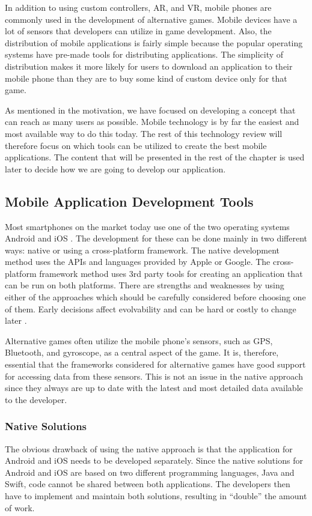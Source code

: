 \documentclass[../Main.tex]{subfiles}
\begin{document}
In addition to using custom controllers, AR, and VR, mobile phones are commonly used in the development of alternative games. Mobile devices have a lot of sensors that developers can utilize in game development. Also, the distribution of mobile applications is fairly simple because the popular operating systems have pre-made tools for distributing applications. The simplicity of distribution makes it more likely for users to download an application to their mobile phone than they are to buy some kind of custom device only for that game.

As mentioned in the motivation, we have focused on developing a concept that can reach as many users as possible. Mobile technology is by far the easiest and most available way to do this today. The rest of this technology review will therefore focus on which tools can be utilized to create the best mobile applications. The content that will be presented in the rest of the chapter is used later to decide how we are going to develop our application.


\subsection{Mobile Application Development Tools}
Most smartphones on the market today use one of the two operating systems Android and iOS \citep{statcounter_mobile_2020}. The development for these can be done mainly in two different ways: native or using a cross-platform framework. The native development method uses the APIs and languages provided by Apple or Google. The cross-platform framework method uses 3rd party tools for creating an application that can be run on both platforms. There are strengths and weaknesses by using either of the approaches which should be carefully considered before choosing one of them. Early decisions affect evolvability and can be hard or costly to change later \citep{ford_building_2017}. 

Alternative games often utilize the mobile phone’s sensors, such as GPS, Bluetooth, and gyroscope, as a central aspect of the game. It is, therefore, essential that the frameworks considered for alternative games have good support for accessing data from these sensors. This is not an issue in the native approach since they always are up to date with the latest and most detailed data available to the developer.


\subsubsection{Native Solutions}
The obvious drawback of using the native approach is that the application for Android and iOS needs to be developed separately. Since the native solutions for Android and iOS are based on two different programming languages, Java and Swift, code cannot be shared between both applications. The developers then have to implement and maintain both solutions, resulting in “double” the amount of work.
\end{document}
